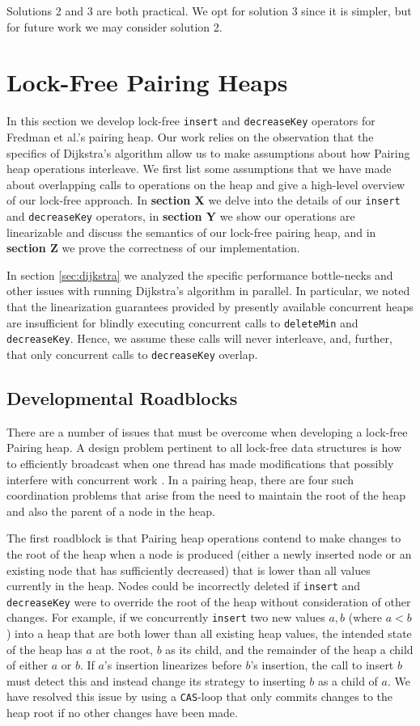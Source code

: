 \documentclass{acm_proc_article-sp}
\begin{document}
Solutions 2 and 3 are both practical. We opt for solution 3 since it is simpler, but
for future work we may consider solution 2.

\section{Lock-Free Pairing Heaps}
In this section we develop lock-free \texttt{insert} and \texttt{decreaseKey}
operators for Fredman et al.'s pairing heap. Our
work relies on the observation that
the specifics of
Dijkstra's algorithm allow us to make assumptions about how
Pairing heap operations interleave. 
We first list some assumptions that we have made about overlapping
calls to operations on the heap and give a high-level overview
of our lock-free approach. In \textbf{section X} we delve into the details of our
\texttt{insert} and \texttt{decreaseKey} operators, in \textbf{section Y} we show
our operations are linearizable and discuss the semantics
of our lock-free pairing heap, and in \textbf{section Z} we prove the correctness
of our implementation.

In section \ref{sec:dijkstra} we analyzed the specific performance bottle-necks and other
issues with running Dijkstra's algorithm in parallel. In particular, we noted that the
linearization guarantees provided by presently available concurrent heaps are insufficient for
blindly executing
concurrent calls to \texttt{deleteMin} and \texttt{decreaseKey}. Hence, we assume
these calls will never interleave, and, further, that only concurrent calls to 
\texttt{decreaseKey} overlap.

\subsection{Developmental Roadblocks}
There are a number of issues that must be overcome when developing
a lock-free Pairing heap. A design problem pertinent to all lock-free data
structures is how to efficiently broadcast when one thread has made modifications
that possibly interfere with concurrent work \cite{herlihy91}. 
In a pairing heap, there
are four such coordination problems that arise from the need to
maintain the root of the heap and also the parent of a node in the heap.

The first roadblock is that Pairing heap operations contend to
make changes to the root of the heap when a node is produced (either a newly inserted
node or an existing node that has sufficiently decreased)
that is lower than all values currently in the heap.
Nodes could be incorrectly deleted if \texttt{insert} and \texttt{decreaseKey}
were to override the root of the heap without consideration of other changes.
For example, if we concurrently \texttt{insert} two new values $a,b$ (where $a < b$) into a
heap that are both lower than all existing heap values, the intended state of the heap
has $a$ at the root, $b$ as its child, and the remainder of the heap a child of either $a$
or $b$. If
$a$'s insertion linearizes before $b$'s insertion, the call to insert $b$ must detect this
and instead change its strategy to inserting $b$ as a child of $a$. We have resolved
this issue by using a \texttt{CAS}-loop that only commits changes to the heap root
if no other changes have been made.
\end{document}
